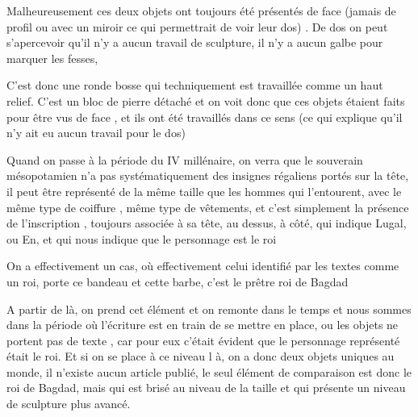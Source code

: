 \documentclass[a4paper]{article}
\begin{document}
\bigskip

{
Malheureusement ces deux objets ont toujours été présentés de face (jamais de profil ou avec un miroir ce qui
permettrait de voir leur dos) . De dos on peut s'apercevoir qu'il n'y a aucun travail de sculpture, il n'y a aucun
galbe pour marquer les fesses, }

{
C'est donc une ronde bosse qui techniquement est travaillée comme un haut relief. C'est un bloc de pierre détaché et on
voit donc que ces objets étaient faits pour être vus de face , et ils ont été travaillés dans ce sens (ce qui explique
qu'il n'y ait eu aucun travail pour le dos)}


\bigskip

{
Quand on passe à la période du IV millénaire, on verra que le souverain mésopotamien n'a pas systématiquement des
insignes régaliens portés sur la tête, il peut être représenté de la même taille que les hommes qui l'entourent, avec
le même type de coiffure , même type de vêtements, et c'est simplement la présence de l'inscription , toujours associée
à sa tête, au dessus, à côté, qui indique Lugal, ou En, et qui nous indique que le personnage est le roi}


\bigskip

{
On a effectivement un cas, où effectivement celui identifié par les textes comme un roi, porte ce bandeau et cette
barbe, c'est le prêtre roi de Bagdad}


\bigskip

{
A partir de là, on prend cet élément et on remonte dans le temps et nous sommes dans la période où l'écriture est en
train de se mettre en place, ou les objets ne portent pas de texte , car pour eux c'était évident que le personnage
représenté était le roi. Et si on se place à ce niveau l à, on a donc deux objets uniques au monde, il n'existe aucun
article publié, le seul élément de comparaison est donc le roi de Bagdad, mais qui est brisé au niveau de la taille et
qui présente un niveau de sculpture plus avancé.}


\bigskip


\bigskip


\bigskip


\bigskip


\bigskip


\bigskip


\bigskip


\bigskip
\end{document}
